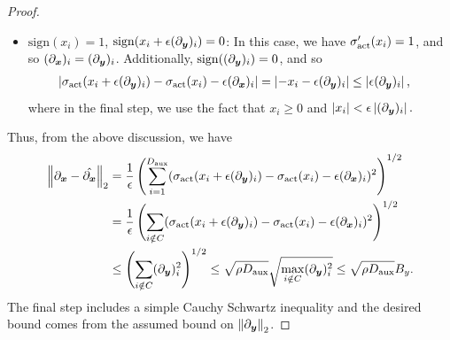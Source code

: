 \begin{proof}
\begin{itemize}
        \item  $\mathrm{sign} (x_i) = 1$, $\mathrm{sign} (x_i + \epsilon (\partial_{{\bm{y}}})_i ) = 0$: In this case, we have $\sigma_{\textrm{act}}'(x_i) = 1$, and so $(\partial_{{\bm{x}}})_i = (\partial_{{\bm{y}}})_i$.  Additionally, $\mathrm{sign} ( (\partial_{{\bm{y}}})_i ) = 0$, and so
        \begin{align*}
        \left|  \sigma_{\textrm{act}}( x_i + \epsilon (\partial_{{\bm{y}}})_i ) - \sigma_{\textrm{act}}( x_i ) - \epsilon (\partial_{{\bm{x}}})_i  \right| &= \left|  - x_i  - \epsilon (\partial_{{\bm{y}}})_i  \right| 
        \leq \left|  \epsilon (\partial_{{\bm{y}}})_i  \right|,
        \end{align*}
        where in the final step, we use the fact that $x_i \ge 0$ and $\left| x_i \right| < \epsilon \left|  (\partial_{{\bm{y}}})_i  \right|.$ 
        
    \end{itemize}

    Thus, from the above discussion, we have
    \begin{align*}
        \left\| \partial_{{\bm{x}}} - \Hat{\partial_{{\bm{x}}}} \right\|_2 &= \frac{1}{\epsilon} \left( \sum_{i=1}^{D_{\text{aux}}} (\sigma_{\textrm{act}}( x_i + \epsilon (\partial_{{\bm{y}}})_i ) - \sigma_{\textrm{act}}( x_i ) - \epsilon (\partial_{{\bm{x}}})_i)^2 \right)^{1/2} \\&
        = \frac{1}{\epsilon} \left(  \sum_{i \notin C} (\sigma_{\textrm{act}}( x_i + \epsilon (\partial_{{\bm{y}}})_i ) - \sigma_{\textrm{act}}( x_i ) - \epsilon (\partial_{{\bm{x}}})_i)^2 \right)^{1/2} \\&
        \leq \left(  \sum_{i \notin C}  (\partial_{{\bm{y}}})_i^2 \right)^{1/2} \leq \sqrt{\rho D_{\text{aux}}} \sqrt{\max_{i \notin C}  (\partial_{{\bm{y}}})^2_i } \leq \sqrt{\rho D_{\text{aux}}} B_y.
    \end{align*}
    The final step includes a simple Cauchy Schwartz inequality and the desired bound comes from the assumed bound on $\left\| \partial_{{\bm{y}}} \right\|_2 $.
\end{proof}
